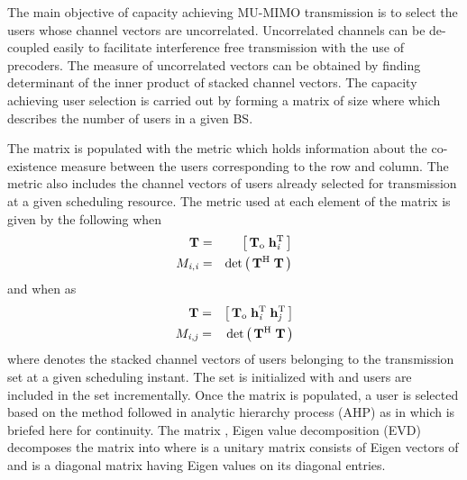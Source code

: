 
The main objective of capacity achieving MU-MIMO transmission is to select the users whose channel vectors are uncorrelated. Uncorrelated channels can be de-coupled easily to facilitate interference free transmission with the use of precoders. The measure of uncorrelated vectors can be obtained by finding determinant of the inner product of stacked  channel vectors. The capacity achieving user selection is carried out by forming a matrix  of size  where  which describes the number of users in a given BS.

The matrix  is populated with the metric which holds information about the co-existence measure between the users corresponding to the  row and  column. The metric also includes the channel vectors of users already selected for transmission at a given scheduling resource. The metric used at each element of the matrix  is given by the following when 
\begin{eqnarray}
\mathbf{T} &=& \left [\,\mathbf{T}_{\mathrm{o}} \; \mathbf{h}_{\mathit{i}}^{\mathrm{T}} \, \right ] \\
{M}_{\mathit{i},\mathit{i}} &=& \det{\left ( \, \mathbf{T}^{\mathrm{H}} \; \mathbf{T} \, \right )} \label{mca1-e1:1}
\label{mca1-e1}
\end{eqnarray}
and when  as
\begin{eqnarray}
\mathbf{T} &=& \left [\,\mathbf{T}_{\mathrm{o}} \; \mathbf{h}_{\mathit{i}}^{\mathrm{T}} \; \mathbf{h}_{\mathit{j}}^{\mathrm{T}} \, \right ] \\
{M}_{\mathit{i},\mathit{j}} &=& \det{\left ( \, \mathbf{T}^{\mathrm{H}} \; \mathbf{T} \, \right )} \label{mca1-e2:1}
\label{mca1-e2}
\end{eqnarray}
where  denotes the stacked channel vectors of users belonging to the transmission set  at a given scheduling instant. The set  is initialized with \me{\emptyset} and users are included in the set incrementally. Once the matrix  is populated, a user is selected based on the method followed in analytic hierarchy process (AHP) as in \cite{saaty2008decision} which is briefed here for continuity. The matrix , Eigen value decomposition (EVD) decomposes the matrix into  where  is a unitary matrix consists of Eigen vectors of  and  is a diagonal matrix having Eigen values on its diagonal entries.

